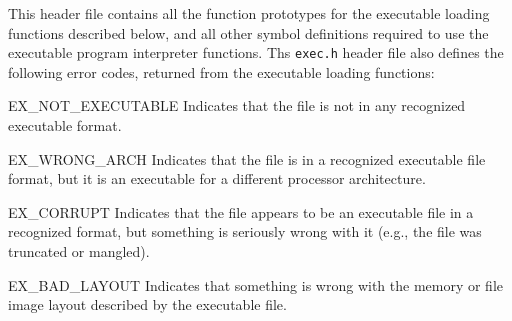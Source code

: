 \begin{apidesc}
	This header file contains all the function prototypes
	for the executable loading functions described below,
	and all other symbol definitions required
	to use the executable program interpreter functions.
	Ths \texttt{exec.h} header file
	also defines the following error codes,
	returned from the executable loading functions:
	\begin{icsymlist}
	\item[EX_NOT_EXECUTABLE]
		Indicates that the file
		is not in any recognized executable format.
	\item[EX_WRONG_ARCH]
		Indicates that the file
		is in a recognized executable file format,
		but it is an executable for a different processor architecture.
	\item[EX_CORRUPT]
		Indicates that the file appears
		to be an executable file in a recognized format,
		but something is seriously wrong with it
		(e.g., the file was truncated or mangled).
	\item[EX_BAD_LAYOUT]
		Indicates that something is wrong
		with the memory or file image layout
		described by the executable file.
	\end{icsymlist}
\end{apidesc}

